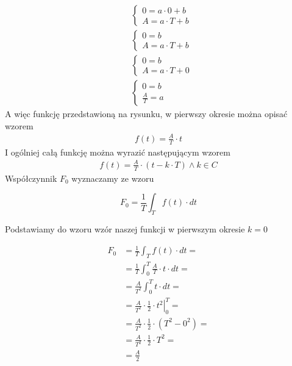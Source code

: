 \begin{task}
\begin{align*}
&\left\{\begin{matrix}
0 = a\cdot 0 +b\\ 
A = a\cdot T +b
\end{matrix}\right. \\
&\left\{\begin{matrix}
0 = b\\ 
A = a\cdot T +b
\end{matrix}\right. \\
&\left\{\begin{matrix}
0 = b\\ 
A = a\cdot T +0
\end{matrix}\right. \\
&\left\{\begin{matrix}
0 = b\\ 
\frac{A}{T} = a
\end{matrix}\right.
\end{align*}
A więc funkcję przedstawioną na rysunku, w pierwszy okresie można opisać wzorem
\begin{align*}
f(t) = \frac{A}{T}\cdot t
\end{align*}
I ogólniej całą funkcję można wyrazić następującym wzorem
\begin{align*}
f(t) = \frac{A}{T}\cdot \left(t-k\cdot T\right) \wedge k \in C
\end{align*}
Współczynnik $F_0$ wyznaczamy ze wzoru

\begin{equation}
F_0=\frac{1}{T}\int_{T}f(t) \cdot dt
\end{equation}

Podstawiamy do wzoru wzór naszej funkcji w pierwszym okresie $k=0$

\begin{align*}
F_0&=\frac{1}{T}\int_{T}f(t) \cdot dt=\\
&=\frac{1}{T}\int_{0}^{T} \frac{A}{T}\cdot t \cdot dt=\\
&=\frac{A}{T^2}\int_{0}^{T} t \cdot dt=\\
&=\frac{A}{T^2}\cdot \left. \frac{1}{2}\cdot t^2 \right|_{0}^{T}=\\
&=\frac{A}{T^2}\cdot \frac{1}{2}\cdot \left( T^2 -0^2 \right)=\\
&=\frac{A}{T^2}\cdot \frac{1}{2}\cdot T^2=\\
&=\frac{A}{2}
\end{align*}


\end{task}
